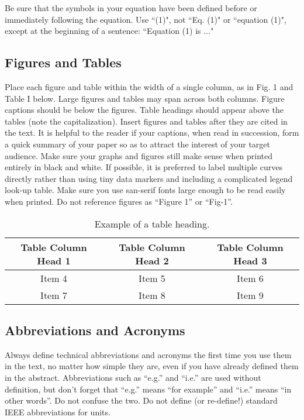 \documentclass[conference, 10pt]{IEEEtran}
\begin{document}
Be sure that the symbols in your equation have been defined before or immediately following the equation. Use ``(1)", not ``Eq. (1)" or ``equation (1)", except at the beginning of a sentence: ``Equation (1) is ..."

\subsection{Figures and Tables}
Place each figure and table within the width of a single column, as in Fig. 1 and Table I below. Large figures and tables may span across both columns. Figure captions should be below the figures. Table headings should appear above the tables (note the capitalization). Insert figures and tables after they are cited in the text. It is helpful to the reader if your captions, when read in succession, form a quick summary of your paper so as to attract the interest of your target audience. Make sure your graphs and figures still make sense when printed entirely in black and white. If possible, it is preferred to label multiple curves directly rather than using tiny data markers and including a complicated legend look-up table. Make sure you use san-serif fonts large enough to be read easily when printed. Do not reference figures as ``Figure 1'' or ``Fig-1''.


\begin{table}[h]
\begin{center}
\caption{Example of a table heading.} \label{Table1Label}
\begin{tabular}{|c|c|c|}
 \hline
 Table Column Head 1 & Table Column Head 2 & Table Column Head 3\\
 \hline
 Item 4 & Item 5 & Item 6\\
 \hline
 Item 7 & Item 8 & Item 9\\
 \hline
\end{tabular}
\end{center}
\end{table}

\subsection{Abbreviations and Acronyms}
Always define technical abbreviations and acronyms the first time you use them in the text, no matter how simple they are, even if you have already defined them in the abstract. Abbreviations such as ``e.g.'' and ``i.e.'' are used without definition, but don’t forget that ``e.g.'' means ``for example'' and ``i.e.'' means ``in other words''. Do not confuse the two. Do not define (or re-define!) standard IEEE abbreviations for units.
\end{document}
